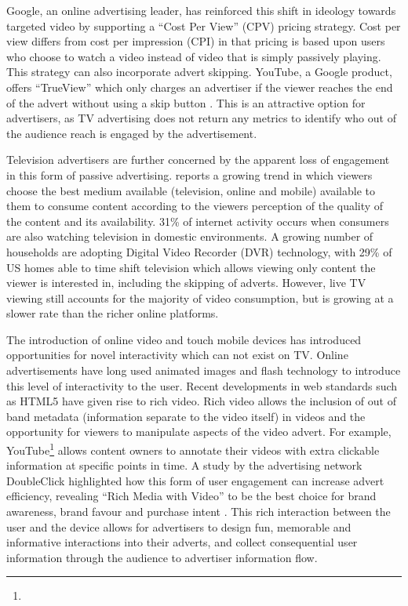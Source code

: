 	Google, an online advertising leader, has reinforced this shift in ideology towards targeted video by supporting a ``Cost Per View'' (CPV) pricing strategy. Cost per view differs from cost per impression (CPI) in that pricing is based upon users who choose to watch a video instead of video that is simply passively playing. This strategy can also incorporate advert skipping. YouTube, a Google product, offers ``TrueView'' which only charges an advertiser if the viewer reaches the end of the advert without using a skip button \citep{trueview}. This is an attractive option for advertisers, as TV advertising does not return any metrics to identify who out of the audience reach is engaged by the advertisement.

	Television advertisers are further concerned by the apparent loss of engagement in this form of passive advertising. \citet{three-screen} reports a growing trend in which viewers choose the best medium available (television, online and mobile) available to them to consume content according to the viewers perception of the quality of the content and its availability. 31\% of internet activity occurs when consumers are also watching television in domestic environments. A growing number of households are adopting Digital Video Recorder (DVR) technology, with 29\% of US homes able to time shift television which allows viewing only content the viewer is interested in, including the skipping of adverts. However, live TV viewing still accounts for the majority of video consumption, but is growing at a slower rate than the richer online platforms. \citep{three-screen}

	The introduction of online video and touch mobile devices has introduced opportunities for novel interactivity which can not exist on TV. Online advertisements have long used animated images and flash technology to introduce this level of interactivity to the user. Recent developments in web standards such as HTML5 have given rise to rich video. Rich video allows the inclusion of out of band metadata (information separate to the video itself) in videos and the opportunity for viewers to manipulate aspects of the video advert. For example, YouTube\footnote{} allows content owners to annotate their videos with extra clickable information at specific points in time. A study by the advertising network DoubleClick highlighted how this form of user engagement can increase advert efficiency, revealing ``Rich Media with Video'' to be the best choice for brand awareness, brand favour and purchase intent \citep{rich-video}. This rich interaction between the user and the device  allows for advertisers to design fun, memorable and informative interactions into their adverts, and collect consequential user information through the audience to advertiser information flow.

